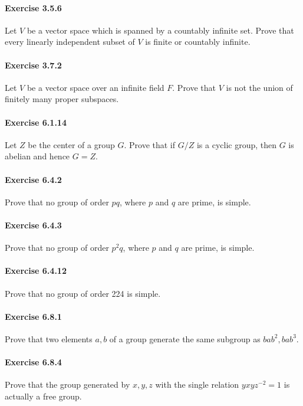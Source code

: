 \documentclass{article}
\begin{document}
\paragraph{Exercise 3.5.6} Let $V$ be a vector space which is spanned by a countably infinite set. Prove that every linearly independent subset of $V$ is finite or countably infinite.

\paragraph{Exercise 3.7.2} Let $V$ be a vector space over an infinite field $F$. Prove that $V$ is not the union of finitely many proper subspaces.

\paragraph{Exercise 6.1.14} Let $Z$ be the center of a group $G$. Prove that if $G / Z$ is a cyclic group, then $G$ is abelian and hence $G=Z$. 

\paragraph{Exercise 6.4.2} Prove that no group of order $p q$, where $p$ and $q$ are prime, is simple.

\paragraph{Exercise 6.4.3} Prove that no group of order $p^2 q$, where $p$ and $q$ are prime, is simple.

\paragraph{Exercise 6.4.12} Prove that no group of order 224 is simple.

\paragraph{Exercise 6.8.1} Prove that two elements $a, b$ of a group generate the same subgroup as $b a b^2, b a b^3$.

\paragraph{Exercise 6.8.4} Prove that the group generated by $x, y, z$ with the single relation $y x y z^{-2}=1$ is actually a free group.
\end{document}
